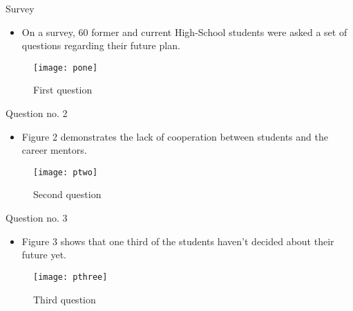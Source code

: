\documentclass{beamer}
\begin{document}


\begin{frame}{Survey}
	
	\begin{itemize}
		\item On a survey, 60 former and current High-School students were asked a set of questions regarding their future plan.
	\end{itemize}
	
	\begin{figure}[t]
		\texttt{[image: pone]}
		\centering
		\caption{First question}
	\end{figure}
\end{frame}


\begin{frame}{Question no. 2}
	
	\begin{itemize}
		\item Figure 2 demonstrates the lack of cooperation between students and the career mentors.
	\end{itemize}
	
	\begin{figure}[t]
		\texttt{[image: ptwo]}
		\centering
		\caption{Second question}
	\end{figure}
\end{frame}


\begin{frame}{Question no. 3}
	
	\begin{itemize}
		\item Figure 3 shows that one third of the students haven't decided about their future yet.
	\end{itemize}
	
	\begin{figure}[t]
		\texttt{[image: pthree]}
		\centering
		\caption{Third question}
	\end{figure}
\end{frame}

\end{document}
